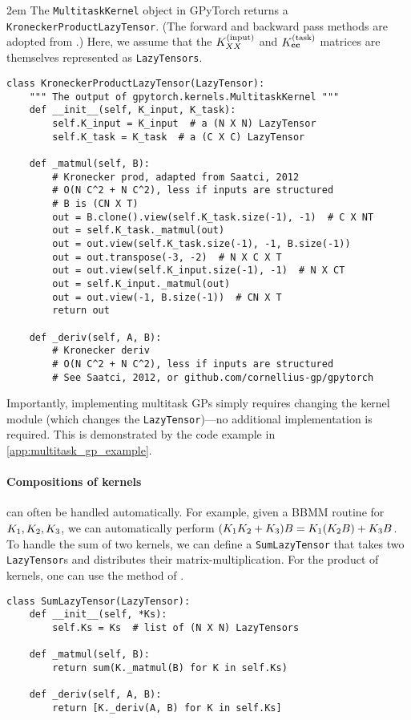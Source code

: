 \emergencystretch 2em
The {\tt MultitaskKernel} object in GPyTorch returns a {\tt KroneckerProductLazyTensor}.
(The forward and backward pass methods are adopted from \citet{saatcci2012scalable}.)
Here, we assume that the $K^{(\text{input})}_{XX}$ and $K^{(\text{task})}_{\mathbf{c}\mathbf{c}}$ matrices are themselves represented as {\tt LazyTensors}.
%
\begin{verbatim}
class KroneckerProductLazyTensor(LazyTensor):
    """ The output of gpytorch.kernels.MultitaskKernel """
    def __init__(self, K_input, K_task):
        self.K_input = K_input  # a (N X N) LazyTensor
        self.K_task = K_task  # a (C X C) LazyTensor

    def _matmul(self, B):
        # Kronecker prod, adapted from Saatci, 2012
        # O(N C^2 + N C^2), less if inputs are structured
        # B is (CN X T)
        out = B.clone().view(self.K_task.size(-1), -1)  # C X NT
        out = self.K_task._matmul(out)
        out = out.view(self.K_task.size(-1), -1, B.size(-1))
        out = out.transpose(-3, -2)  # N X C X T
        out = out.view(self.K_input.size(-1), -1)  # N X CT
        out = self.K_input._matmul(out)
        out = out.view(-1, B.size(-1))  # CN X T
        return out

    def _deriv(self, A, B):
        # Kronecker deriv
        # O(N C^2 + N C^2), less if inputs are structured
        # See Saatci, 2012, or github.com/cornellius-gp/gpytorch
\end{verbatim}
%
\noindent
Importantly, implementing multitask GPs simply requires changing the kernel module (which changes the {\tt LazyTensor})---no additional implementation is required.
This is demonstrated by the code example in \cref{app:multitask_gp_example}.

\paragraph{Compositions of kernels} can often be handled automatically.
For example, given a BBMM routine for $K_{1},K_{2},K_{3}$, we can automatically perform $(K_{1}K_{2}+K_{3}) B = K_{1}(K_{2} B ) + K_{3} B$.
To handle the sum of two kernels, we can define a {\tt SumLazyTensor} that takes two {\tt LazyTensor}s and distributes their matrix-multiplication.
For the product of kernels, one can use the method of \citet{gardner2018product}.
%
\begin{verbatim}
class SumLazyTensor(LazyTensor):
    def __init__(self, *Ks):
        self.Ks = Ks  # list of (N X N) LazyTensors

    def _matmul(self, B):
        return sum(K._matmul(B) for K in self.Ks)

    def _deriv(self, A, B):
        return [K._deriv(A, B) for K in self.Ks]
\end{verbatim}

